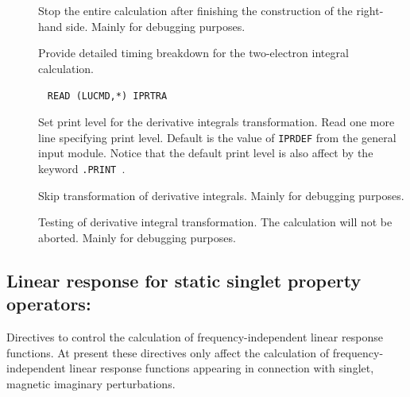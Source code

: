\begin{description}
\item[] Stop the entire calculation after finishing
the construction of the right-hand side. Mainly for debugging purposes.

\item[] Provide detailed timing breakdown for the
two-electron integral calculation.

\item[]\verb| |\newline
\verb|READ (LUCMD,*) IPRTRA|

Set print level for the derivative integrals transformation.  Read one more
line specifying print level. Default is the value of
\verb|IPRDEF| from the general input module. Notice that the default print
level is also affect by the keyword \verb|.PRINT |.

\item[] Skip transformation of derivative integrals.
Mainly for debugging purposes.

\item[] Testing of derivative integral
transformation. The calculation will not be aborted. Mainly for
debugging purposes.
\end{description}

\subsection{Linear response for static singlet property operators:
}\label{sec:linres}

Directives to control the calculation of frequency-independent linear
response functions. At
present these directives only affect the
calculation of frequency-independent linear response functions appearing
in connection with singlet, magnetic imaginary perturbations.

